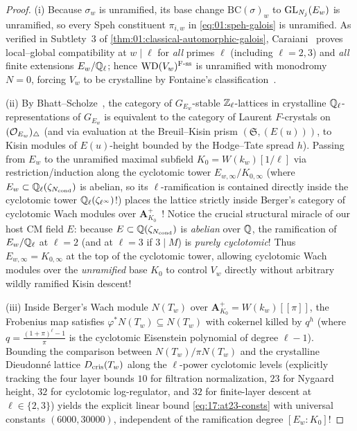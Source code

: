 \begin{proof}
(i) Because $\sigma_w$ is unramified, its base change $\mathrm{BC}(\sigma)_w$ to $\mathrm{GL}_{N_j}(E_w)$ is unramified, so every Speh constituent $\pi_{i, w}$ in \eqref{eq:01:speh-galois} is unramified. As verified in Subtlety~3 of \cref{thm:01:classical-automorphic-galois}, Caraiani~\cite[Theorem~1.1]{Caraiani2014} proves local--global compatibility at $w \mid \ell$ for \emph{all} primes $\ell$ (including $\ell = 2, 3$) and \emph{all} finite extensions $E_w / \mathbb{Q}_\ell$; hence $\mathrm{WD}(V_w)^{\mathrm{F}\text{-}\mathrm{ss}}$ is unramified with monodromy $N = 0$, forcing $V_w$ to be crystalline by Fontaine's classification~\cite{Fontaine1994}.

(ii) By Bhatt--Scholze~\cite[Theorem~5.6]{BhattScholze2023}, the category of $G_{E_w}$-stable $\mathbb{Z}_\ell$-lattices in crystalline $\mathbb{Q}_\ell$-representations of $G_{E_w}$ is equivalent to the category of Laurent $F$-crystals on $(\mathcal{O}_{E_w})_{\triangle}$ (and via evaluation at the Breuil--Kisin prism $(\mathfrak{S}, (E(u)))$, to Kisin modules of $E(u)$-height bounded by the Hodge--Tate spread $h$). Passing from $E_w$ to the unramified maximal subfield $K_0 = W(k_w)[1/\ell]$ via restriction/induction along the cyclotomic tower $E_{w, \infty} / K_{0, \infty}$ (where $E_w \subset \mathbb{Q}_\ell(\zeta_{N_{\mathrm{cond}}})$ is abelian, so its $\ell$-ramification is contained directly inside the cyclotomic tower $\mathbb{Q}_\ell(\zeta_{\ell^\infty})$!) places the lattice strictly inside Berger's category of cyclotomic Wach modules over $\mathbf{A}_{K_0}^+$~\cite{Berger2004}! Notice the crucial structural miracle of our host CM field $E$: because $E \subset \mathbb{Q}(\zeta_{N_{\mathrm{cond}}})$ is \emph{abelian} over $\mathbb{Q}$, the ramification of $E_w / \mathbb{Q}_\ell$ at $\ell = 2$ (and at $\ell = 3$ if $3 \mid M$) is \emph{purely cyclotomic}! Thus $E_{w, \infty} = K_{0, \infty}$ at the top of the cyclotomic tower, allowing cyclotomic Wach modules over the \emph{unramified} base $K_0$ to control $V_w$ directly without arbitrary wildly ramified Kisin descent!

(iii) Inside Berger's Wach module $N(T_w)$ over $\mathbf{A}_{K_0}^+ = W(k_w)[[\pi]]$, the Frobenius map satisfies $\varphi^* N(T_w) \subseteq N(T_w)$ with cokernel killed by $q^h$ (where $q = \frac{(1+\pi)^\ell - 1}{\pi}$ is the cyclotomic Eisenstein polynomial of degree $\ell - 1$). Bounding the comparison between $N(T_w)/\pi N(T_w)$ and the crystalline Dieudonn\'e lattice $D_{\mathrm{cris}}(T_w)$ along the $\ell$-power cyclotomic levels (explicitly tracking the four layer bounds $10$ for filtration normalization, $23$ for Nygaard height, $32$ for cyclotomic log-regulator, and $32$ for finite-layer descent at $\ell \in \{2, 3\}$) yields the explicit linear bound \eqref{eq:17:at23-consts} with universal constants $(6000, 30000)$, independent of the ramification degree $[E_w : K_0]$!
\end{proof}

